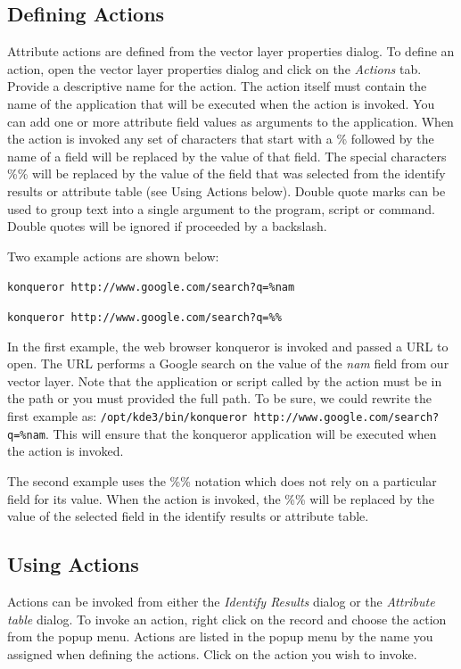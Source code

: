 \subsection{Defining Actions}
Attribute actions are defined from the vector layer properties dialog. To define
an action, open the vector layer properties dialog and click on the
\textit{Actions} tab. Provide a descriptive name for the action. The action
itself must contain the name of the application that will be executed when the
action is invoked. You can add one or more attribute field values as arguments
to the application. When the action is invoked any set of characters that start
with a \% followed by the name of a field will be replaced by the value of that
field.  The special characters \%\% \index{\%\%}will be replaced by the value of
the field that was selected from the identify results or attribute table (see
Using Actions below).  Double quote marks can be used to group text into a
single argument to the program, script or command. Double quotes will be ignored
if proceeded by a backslash.  

Two example actions are shown below:
\begin{compactenum}
  \item \texttt{konqueror http://www.google.com/search?q=\%nam}
  \item \texttt{konqueror http://www.google.com/search?q=\%\%}
\end{compactenum}
In the first example, the web browser konqueror is invoked and passed a URL to
open. The URL performs a Google search on the value of the \textit{nam} field
from our vector layer. Note that the application or script called by the action
must be in the path or you must provided the full path. To be sure, we could
rewrite the first example as: \texttt{/opt/kde3/bin/konqueror
http://www.google.com/search?q=\%nam}. This will ensure that the konqueror
application will be executed when the action is invoked.

The second example uses the \%\% notation which does not rely on a particular
field for its value. When the action is invoked, the \%\% will be replaced by
the value of the selected field in the identify results or attribute table.

\subsection{Using Actions}
Actions can be invoked from either the \textit{Identify Results} dialog or the
\textit{Attribute table} dialog. To invoke an action, right click on the record
and choose the action from the popup menu. Actions are listed in the popup menu
by the name you assigned when defining the actions. Click on the action you wish
to invoke.

